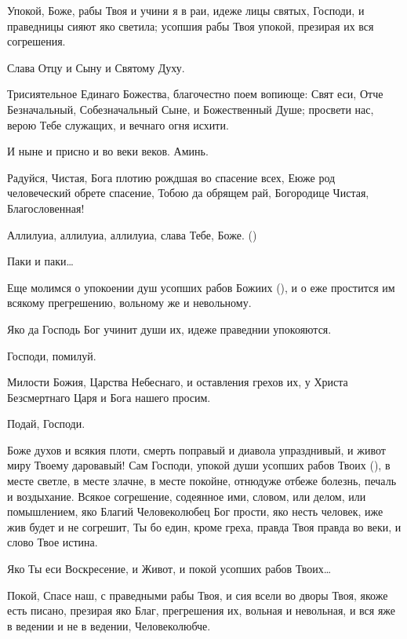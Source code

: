 \begin{mymulticols}

Упокой, Боже, рабы Твоя и учини я в раи, идеже лицы святых, Господи, и праведницы сияют яко светила; усопшия рабы Твоя упокой, презирая их вся согрешения. 

Слава Отцу и Сыну и Святому Духу. 

Трисиятельное Единаго Божества, благочестно поем вопиюще: Свят еси, Отче Безначальный, Собезначальный Сыне, и Божественный Душе; просвети нас, верою Тебе служащих, и вечнаго огня исхити. 

И ныне и присно и во веки веков. Аминь. 

Радуйся, Чистая, Бога плотию рождшая во спасение всех, Еюже род человеческий обрете спасение, Тобою да обрящем рай, Богородице Чистая, Благословенная! 

Аллилуиа, аллилуиа, аллилуиа, слава Тебе, Боже. () 

 Паки и паки… 

Еще молимся о упокоении душ усопших рабов Божиих (), и о еже простится им всякому прегрешению, вольному же и невольному. 

 Яко да Господь Бог учинит души их, идеже праведнии упокояются. 

 Господи, помилуй. 

Милости Божия, Царства Небеснаго, и оставления грехов их, у Христа Безсмертнаго Царя и Бога нашего просим. 

 Подай, Господи.


Боже духов и всякия плоти, смерть поправый и диавола упразднивый, и живот миру Твоему даровавый! Сам Господи, упокой души усопших рабов Твоих (), в месте светле, в месте злачне, в месте покойне, отнюдуже отбеже болезнь, печаль и воздыхание. Всякое согрешение, содеянное ими, словом, или делом, или помышлением, яко Благий Человеколюбец Бог прости, яко несть человек, иже жив будет и не согрешит, Ты бо един, кроме греха, правда Твоя правда во веки, и слово Твое истина. 

 Яко Ты еси Воскресение, и Живот, и покой усопших рабов Твоих…


Покой, Спасе наш, с праведными рабы Твоя, и сия всели во дворы Твоя, якоже есть писано, презирая яко Благ, прегрешения их, вольная и невольная, и вся яже в ведении и не в ведении, Человеколюбче. 


\end{mymulticols}
